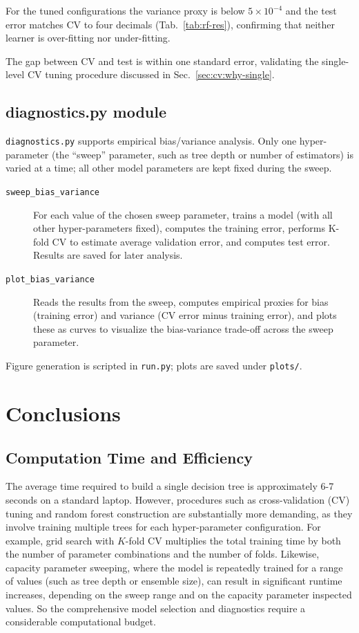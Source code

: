 \documentclass[12pt]{report}
\begin{document}
For the tuned configurations the variance proxy is below $5\times10^{-4}$ and
the test error matches CV to four decimals (Tab.~\ref{tab:rf-res}), confirming
that neither learner is over-fitting nor under-fitting.

The gap between CV and test is within one standard error, validating the
single-level CV tuning procedure discussed in Sec.~\ref{sec:cv:why-single}.

\subsection{diagnostics.py module}
\texttt{diagnostics.py} supports empirical bias/variance analysis. Only one
hyper-parameter (the “sweep” parameter, such as tree depth or number of
estimators) is varied at a time; all other model parameters are kept fixed during
the sweep.

\begin{description}
  \item[\texttt{sweep\_bias\_variance}]
        For each value of the chosen sweep parameter, trains a model (with all
        other hyper-parameters fixed), computes the training error, performs K-fold
        CV to estimate average validation error, and computes test error. Results
        are saved for later analysis.
  \item[\texttt{plot\_bias\_variance}]
        Reads the results from the sweep, computes empirical proxies for bias
        (training error) and variance (CV error minus training error), and plots
        these as curves to visualize the bias-variance trade-off across the sweep
        parameter.
\end{description}

Figure generation is scripted in \texttt{run.py}; plots are saved under
\texttt{plots/}.

\section*{Conclusions}

\subsection{Computation Time and Efficiency}

The average time required to build a single decision tree is approximately 6-7 seconds 
on a standard laptop. However, procedures such as cross-validation (CV) tuning and random 
forest construction are substantially more demanding, as they involve training multiple 
trees for each hyper-parameter configuration. For example, grid search with $K$-fold CV 
multiplies the total training time by both the number of parameter combinations and the 
number of folds. Likewise, capacity parameter sweeping, where the model is repeatedly 
trained for a range of values (such as tree depth or ensemble size), can result in 
significant runtime increases, depending on the sweep range and on the capacity parameter 
inspected values. So the comprehensive model selection and diagnostics require a 
considerable computational budget.
\end{document}
